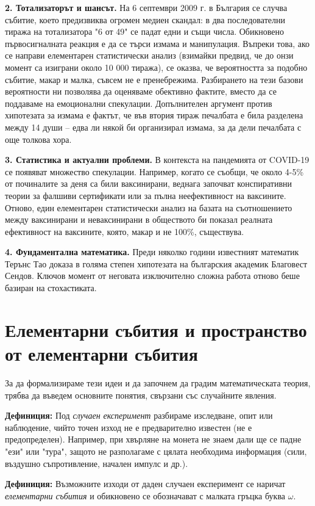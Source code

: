 \documentclass{article}
\begin{document}
\textbf{2. Тотализаторът и шансът.} На 6 септември 2009 г. в България се случва събитие, което предизвиква огромен медиен скандал: в два последователни тиража на тотализатора "6 от 49" се падат едни и същи числа. Обикновено първосигналната реакция е да се търси измама и манипулация. Въпреки това, ако се направи елементарен статистически анализ (взимайки предвид, че до онзи момент са изиграни около 10 000 тиража), се оказва, че вероятността за подобно събитие, макар и малка, съвсем не е пренебрежима. Разбирането на тези базови вероятности ни позволява да оценяваме обективно фактите, вместо да се поддаваме на емоционални спекулации. Допълнителен аргумент против хипотезата за измама е фактът, че във втория тираж печалбата е била разделена между 14 души – едва ли някой би организирал измама, за да дели печалбата с още толкова хора.

\textbf{3. Статистика и актуални проблеми.} В контекста на пандемията от COVID-19 се появяват множество спекулации. Например, когато се съобщи, че около 4-5\% от починалите за деня са били ваксинирани, веднага започват конспиративни теории за фалшиви сертификати или за пълна неефективност на ваксините. Отново, един елементарен статистически анализ на базата на съотношението между ваксинирани и неваксинирани в обществото би показал реалната ефективност на ваксините, която, макар и не 100\%, съществува.

\textbf{4. Фундаментална математика.} Преди няколко години известният математик Терънс Тао доказа в голяма степен хипотезата на българския академик Благовест Сендов. Ключов момент от неговата изключително сложна работа отново беше базиран на стохастиката.

\section{Елементарни събития и пространство от елементарни събития}

За да формализираме тези идеи и да започнем да градим математическата теория, трябва да въведем основните понятия, свързани със случайните явления.

\textbf{Дефиниция:} Под \emph{случаен експеримент} разбираме изследване, опит или наблюдение, чийто точен изход не е предварително известен (не е предопределен). Например, при хвърляне на монета не знаем дали ще се падне "ези" или "тура", защото не разполагаме с цялата необходима информация (сили, въздушно съпротивление, начален импулс и др.).

\textbf{Дефиниция:} Възможните изходи от даден случаен експеримент се наричат \emph{елементарни събития} и обикновено се обозначават с малката гръцка буква $\omega$.
\end{document}

